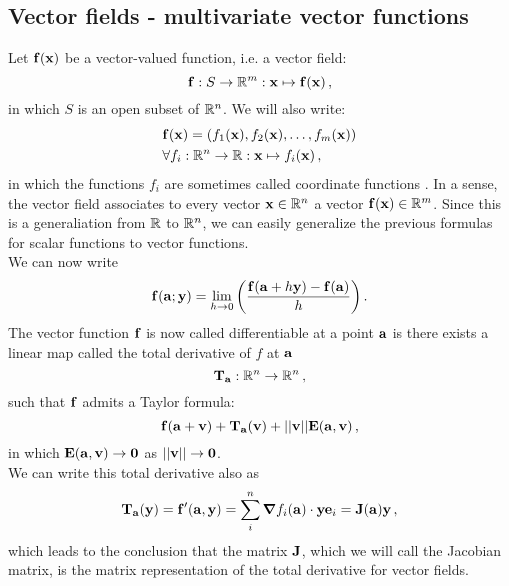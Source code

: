     \subsection{Vector fields - multivariate vector functions}
        Let $\vb{f}(\vb{x})$ be a vector-valued function, i.e. a vector field:
        \begin{equation}
            \vb{f}: S \rightarrow \mathbb{R}^m: \vb{x} \mapsto \vb{f}(\vb{x}) \thinspace ,
        \end{equation}
        in which $S$ is an open subset of $\mathbb{R}^n$. We will also write:
        \begin{align} \label{eq:vector_field}
            &\vb{f}(\vb{x}) = (f_1(\vb{x}), f_2(\vb{x}), \dots, f_m(\vb{x})) \\
            &\forall f_i: \mathbb{R}^n \rightarrow \mathbb{R}: \vb{x} \mapsto f_i(\vb{x}) \thinspace ,
        \end{align}
        in which the functions $f_i$ are sometimes called coordinate functions \cite{Burden2011}. In a sense, the vector field associates to every vector $\vb{x} \in \mathbb{R}^n$ a vector $\vb{f}(\vb{x}) \in \mathbb{R}^m$. Since this is a generaliation from $\mathbb{R}$ to $\mathbb{R}^n$, we can easily generalize the previous formulas for scalar functions to vector functions. \\

        We can now write
        \begin{equation}
            \vb{f}(\vb{a}; \vb{y}) = \lim_{h \to 0} \qty( \frac{\vb{f}(\vb{a} + h \vb{y}) - \vb{f}(\vb{a})}{h} ) \thinspace .
        \end{equation}
        The vector function $\vb{f}$ is now called differentiable at a point $\vb{a}$ is there exists a linear map called the total derivative of $f$ at $\vb{a}$
        \begin{equation}
            \vb{T}_{\vb{a}}: \mathbb{R}^n \to \mathbb{R}^n \thinspace ,
        \end{equation}
        such that $\vb{f}$ admits a Taylor formula:
        \begin{equation}
            \vb{f}(\vb{a} + \vb{v}) + \vb{T}_{\vb{a}}(\vb{v}) + ||\vb{v}|| \vb{E}(\vb{a}, \vb{v}) \thinspace ,
        \end{equation}
        in which $\vb{E}(\vb{a}, \vb{v}) \to \vb{0}$ as $||\vb{v}|| \to \vb{0}$. \\

        We can write this total derivative also as
        \begin{equation}
            \vb{T}_{\vb{a}} (\vb{y}) = \vb{f}'(\vb{a}, \vb{y}) = \sum_i^n \grad{f_i(\vb{a})} \cdot \vb{y} \vb{e}_i = \vb{J}(\vb{a}) \vb{y} \thinspace ,
        \end{equation}
        which leads to the conclusion that the matrix $\vb{J}$, which we will call the Jacobian matrix, is the matrix representation of the total derivative for vector fields. \\

